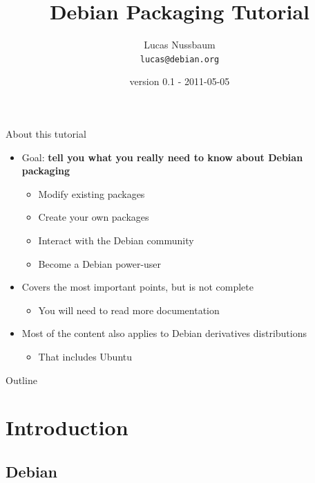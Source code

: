 \documentclass[10pt,final]{beamer}
\title{Debian Packaging Tutorial}
\author[]{Lucas Nussbaum\\{\small\texttt{lucas@debian.org}}}
\date{\footnotesize version 0.1 - 2011-05-05}
\begin{document}
\frame{\titlepage}

\begin{frame}{About this tutorial}
  \begin{itemize}
  \item Goal: \textbf{tell you what you really need to know about Debian packaging}
    \begin{itemize}
      \hbr
    \item Modify existing packages
      \hbr
    \item Create your own packages
	    \hbr
    \item Interact with the Debian community
      \hbr
    \item Become a Debian power-user
    \end{itemize}
    \br
  \item Covers the most important points, but is not complete
    \begin{itemize}
    \item You will need to read more documentation
    \end{itemize}
    \br
  \item Most of the content also applies to Debian derivatives distributions
    \begin{itemize}
      \hbr
    \item That includes Ubuntu
    \end{itemize}
  \end{itemize}
\end{frame}

\begin{frame}{Outline}
  \tableofcontents[hideallsubsections]
\end{frame}

\section{Introduction}

\subsection{Debian}
\end{document}
